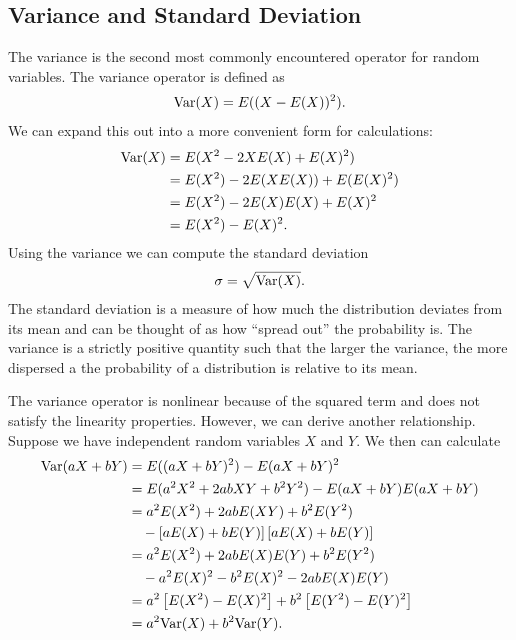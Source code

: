 \subsection{Variance and Standard Deviation}

The variance is the second most commonly encountered operator for random variables. The variance operator is defined as
\begin{align}
  \textrm{Var} ( X ) = E( (X - E(X))^2 ) .
\end{align}
We can expand this out into a more convenient form for calculations:
\begin{align}
  \textrm{Var} ( X ) &= E( X^2 - 2 X E(X) + E(X)^2 ) \nonumber \\*
  &= E(X^2) - 2 E( X E(X) ) + E( E(X)^2 ) \nonumber \\*
  &= E(X^2) - 2 E(X) E(X) + E(X)^2 \nonumber \\*
  &= E(X^2) - E(X)^2 .
\end{align}
Using the variance we can compute the standard deviation
\begin{align}
  \sigma = \sqrt{ \textrm{Var}(X) } .
\end{align}
The standard deviation is a measure of how much the distribution deviates from its mean and can be thought of as how ``spread out'' the probability is. The variance is a strictly positive quantity such that the larger the variance, the more dispersed a the probability of a distribution is relative to its mean.

The variance operator is nonlinear because of the squared term and does not satisfy the linearity properties. However, we can derive another relationship. Suppose we have independent random variables $X$ and $Y$. We then can calculate
\begin{align}
  \textrm{Var} ( aX + bY ) &= E( ( aX + bY )^2 ) - E( aX + bY )^2 \nonumber \\*
  &= E( a^2 X^2 + 2abXY + b^2 Y^2 ) - E( aX + bY ) E( aX + bY ) \nonumber \\*
  &= a^2 E(X^2) + 2ab E(XY) + b^2 E(Y^2) \nonumber \\* &\quad- \left[ aE(X) + bE(Y) \right] \left[ aE(X) + bE(Y) \right] \nonumber \\*
  &= a^2 E(X^2) + 2ab E(X) E(Y) + b^2 E(Y^2) \nonumber \\* &\quad - a^2 E(X)^2 - b^2 E(X)^2 - 2ab E(X) E(Y) \nonumber \\*
  &= a^2 \left[ E(X^2) - E(X)^2 \right] + b^2  \left[ E(Y^2) - E(Y)^2 \right] \nonumber \\*
  &= a^2 \textrm{Var}(X) + b^2 \textrm{Var}(Y) .
\end{align}



